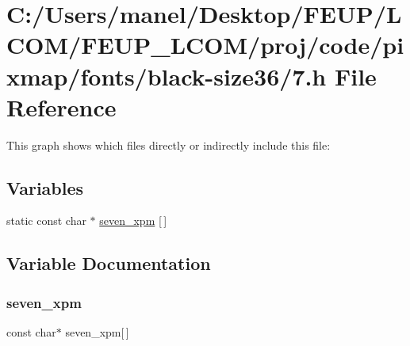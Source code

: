 \hypertarget{black-size36_27_8h}{}\section{C\+:/\+Users/manel/\+Desktop/\+F\+E\+U\+P/\+L\+C\+O\+M/\+F\+E\+U\+P\+\_\+\+L\+C\+O\+M/proj/code/pixmap/fonts/black-\/size36/7.h File Reference}
\label{black-size36_27_8h}
This graph shows which files directly or indirectly include this file\+:
\subsection*{Variables}
\begin{DoxyCompactItemize}
\item 
static const char $\ast$ \mbox{\hyperlink{black-size36_27_8h_aac4834b73a0e390da79d0d829fe3143b}{seven\+\_\+xpm}} \mbox{[}$\,$\mbox{]}
\end{DoxyCompactItemize}


\subsection{Variable Documentation}
\mbox{\label{black-size36_27_8h_aac4834b73a0e390da79d0d829fe3143b}} 
\subsubsection{\texorpdfstring{seven\_xpm}{seven\_xpm}}
{\footnotesize\ttfamily const char$\ast$ seven\+\_\+xpm\mbox{[}$\,$\mbox{]}\hspace{0.3cm}{\ttfamily [static]}}

